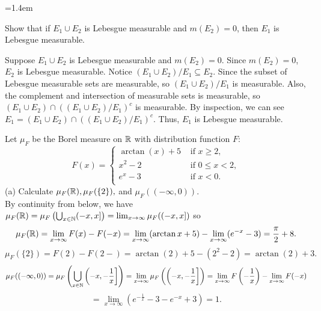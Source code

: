 \begin{list}
{}
{\leftmargin=1.4em}
\item Show that if $E_1 \cup E_2$ is Lebesgue measurable and $m(E_2)=0$, then $E_1$ is Lebesgue measurable.
\begin{pf}
	Suppose $E_1 \cup E_2$ is Lebesgue measurable and $m(E_2)=0$. Since $m(E_2)=0$, $E_2$ is Lebesgue measurable.  Notice $(E_1 \cup E_2) \slash E_1 \subseteq E_2$. Since the subset of Lebesgue measurable sets are measurable, so $(E_1 \cup E_2) \slash E_1$ is measurable. Also, the complement and intersection of measurable sets is measurable, so $(E_1 \cup E_2) \cap ((E_1 \cup E_2) \slash E_1)^c$ is measurable. By inspection, we can see $E_1=(E_1 \cup E_2) \cap ((E_1 \cup E_2) \slash E_1)^c$. Thus, $E_1$ is Lebesgue measurable. 
\end{pf}

\item Let $\mu_F$ be the Borel measure on ${\mathbb R}$ with distribution function $F:$
\[ F(x) = \left\{
 \begin{array}{ll}
	\arctan(x)+5 & \text{ if } x\geq 2,\\
	x^2-2 & \text{ if } 0 \leq x < 2,\\
	e^x - 3 & \text{ if }  x<0.\\
\end{array} \right.
 \]
 (a) Calculate $\mu_F({\mathbb R}), \mu_F(\{2\}),$ and $\mu_F((-\infty, 0))$.\\
 By continuity from below, we have $\mu_F({\mathbb R})= \mu_F\left( \bigcup_{x \in {\mathbb N}} (-x, x] \right) = \lim_{x \rightarrow \infty} \mu_F((-x, x])$ so 
 \[
  \mu_F({\mathbb R})= \lim_{x \rightarrow \infty} F(x) -F(-x)=  \lim_{x \rightarrow \infty} (\arctan x + 5 ) - \lim_{x \rightarrow \infty} (e^{-x}-3) = \frac{\pi}{2} + 8.\]
 \[ \mu_F(\{2\}) = F(2) - F(2-) = \arctan(2) + 5 - (2^2 - 2)= \arctan(2) + 3.
 \]
 \[ \mu_F((-\infty, 0)) = \mu_F\left( \bigcup_{x \in {\mathbb N}} \left(-x, -\frac{1}{x} \right]\right) = \lim_{x \rightarrow \infty} \mu_F\left( \left(-x, -\frac{1}{x} \right] \right) =  \lim_{x \rightarrow \infty} F\left(- \frac{1}{x}\right) - \lim_{x \rightarrow \infty} F(-x)
 \]
 \[
  = \lim_{x \rightarrow \infty}(e^{-\frac{1}{x}} - 3 - e^{-x} + 3 ) = 1 .
 \]
 

\end{list}
